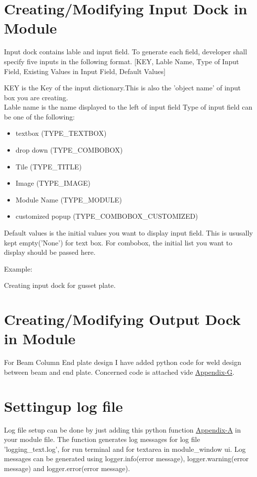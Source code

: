 \documentclass[11pt,a4paper]{report}
\begin{document}
\section{Creating/Modifying Input Dock in Module}
\noindent Input dock contains lable and input field. To generate each field, developer shall specify five inputs in the following format.
[KEY, Lable Name, Type of Input Field, Existing Values in Input Field, Default Values]

KEY is the Key of the input dictionary.This is also the 'object name' of input box you are creating.\\ 
Lable name is the name displayed to the left of input field
Type of input field can be one of the following:
\begin{itemize}
\item textbox (TYPE\_TEXTBOX)
\item drop down (TYPE\_COMBOBOX)
\item Tile (TYPE\_TITLE)
\item Image (TYPE\_IMAGE)
\item Module Name (TYPE\_MODULE)
\item customized popup (TYPE\_COMBOBOX\_CUSTOMIZED)
\end{itemize} 

Default values is the initial values you want to display input field. This is ususally kept empty('None') for text box. For combobox, the initial list you want to display should be passed here.

Example:

Creating input dock for gusset plate.




\section{Creating/Modifying Output Dock in Module}
\noindent For Beam Column End plate design I have added python code for weld design between beam and end plate. Concerned code is attached vide \hyperlink {page.102}{Appendix-G}.

\section{Settingup log file}
\noindent Log file setup can be done by just adding this python function \hyperlink {page.10}{Appendix-A} in your module file. The function generates log messages for log file 'logging\_text.log', for run terminal and for textarea in module\_window ui. Log messages can be generated using logger.info(error message), logger.warning(error message) and logger.error(error message).
\end{document}
